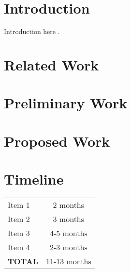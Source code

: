\documentclass{article}
\begin{document}
\newpage
\tableofcontents

\newpage
\listoffigures

\newpage
\doublespacing


\section{Introduction}


Introduction here \cite{SourceYear}.



\section{Related Work}


\section{Preliminary Work}


\section{Proposed Work}


\section{Timeline}

\begin{center}
\begin{tabular}{|l|c|}
\hline
Item 1 & 2 months \\
Item 2 & 3 months \\
Item 3 & 4-5 months \\
Item 4 & 2-3 months \\
\hline
\textbf{TOTAL} & 11-13 months \\
\hline
\end{tabular}
\end{center}
\end{document}
